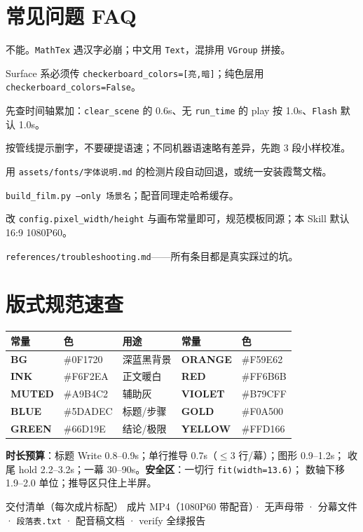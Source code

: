 \documentclass[12pt,a4paper]{ctexart}
\newcommand{\code}[1]{\texttt{\small #1}}
\begin{document}
\section{常见问题 FAQ}

\begin{description}[style=nextline]
    \item[公式里能写中文吗？] 不能。\code{MathTex} 遇汉字必崩；中文用 \code{Text}，混排用 \code{VGroup} 拼接。
    \item[圆柱/球体颜色不生效？] Surface 系必须传 \code{checkerboard\_colors=[亮,暗]}；纯色层用 \code{checkerboard\_colors=False}。
    \item[配音和画面差了半秒？] 先查时间轴累加：\code{clear\_scene} 的 0.6s、无 \code{run\_time} 的 play 按 1.0s、\code{Flash} 默认 1.0s。
    \item[TTS 一直超长？] 按管线提示删字，不要硬提语速；不同机器语速略有差异，先跑 3 段小样校准。
    \item[换电脑字体变了？] 用 \code{assets/fonts/字体说明.md} 的检测片段自动回退，或统一安装霞鹜文楷。
    \item[改了一幕怎么只重渲这一幕？] \code{build\_film.py --only 场景名}；配音同理走哈希缓存。
    \item[能出竖屏/4K 吗？] 改 \code{config.pixel\_width/height} 与画布常量即可，规范模板同源；本 Skill 默认 16:9 1080P60。
    \item[渲染报错先看哪？] \code{references/troubleshooting.md}——所有条目都是真实踩过的坑。
\end{description}

\section{版式规范速查}

\begin{center}
\begin{tabular}{>{\bfseries}p{2.2cm} p{2.6cm} p{3.0cm} >{\bfseries}p{2.2cm} p{2.6cm}}
\hline
\rowcolor{ptbg} 常量 & 色 & 用途 & 常量 & 色 \\
\hline
BG & \#0F1720 & 深蓝黑背景 & ORANGE & \#F59E62 \\
INK & \#F6F2EA & 正文暖白 & RED & \#FF6B6B \\
MUTED & \#A9B4C2 & 辅助灰 & VIOLET & \#B79CFF \\
BLUE & \#5DADEC & 标题/步骤 & GOLD & \#F0A500 \\
GREEN & \#66D19E & 结论/极限 & YELLOW & \#FFD166 \\
\hline
\end{tabular}
\end{center}

\textbf{时长预算}：标题 Write 0.8--0.9s；单行推导 0.7s（$\leq$3 行/幕）；图形 0.9--1.2s；
收尾 hold 2.2--3.2s；一幕 30--90s。\textbf{安全区}：一切行 \code{fit(width=13.6)}；
数轴下移 1.9--2.0 单位；推导区只住上半屏。

\vspace{0.6cm}
\begin{okbox}{交付清单（每次成片标配）}
成片 MP4（1080P60 带配音）· 无声母带 · 分幕文件 · \code{段落表.txt} · 配音稿文档 · verify 全绿报告
\end{okbox}
\end{document}
